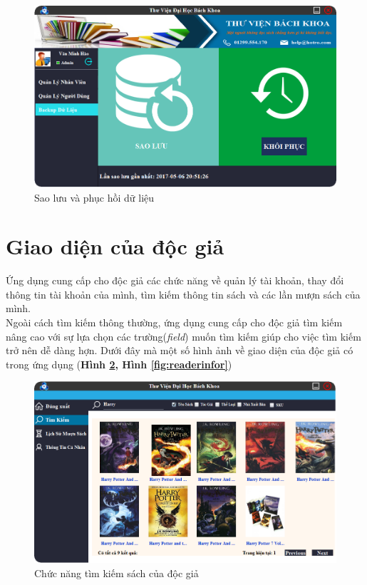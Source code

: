 \documentclass[12pt]{report}
\begin{document}
\begin{itemize}
						\begin{figure}[H]
						\centering
						\includegraphics[scale=0.6]{images/backup.png}
						\caption{Sao lưu và phục hồi dữ liệu}
						\label{fig:backup}
						\end{figure}			
				\end{itemize}
			\section{Giao diện của độc giả}
			Ứng dụng cung cấp cho độc giả các chức năng về quản lý tài khoản, thay đổi thông tin tài khoản của mình, tìm kiếm thông tin sách và các lần mượn sách của mình.\\
			Ngoài cách tìm kiếm thông thường, ứng dụng cung cấp cho độc giả tìm kiếm nâng cao với sự lựa chọn các trường(\textit{field}) muốn tìm kiếm giúp cho việc tìm kiếm trở nên dễ dàng hợn.
			Dưới đây mà một số hình ảnh về giao diện của độc giả có trong ứng dụng (\textbf{Hình \ref{fig:rdsearch}, Hình \ref{fig:readerinfor}})
						\begin{figure}[H]
						\centering
						\includegraphics[scale=0.65]{images/searchreader.png}
						\caption{Chức năng tìm kiếm sách của độc giả}
						\label{fig:rdsearch}
						\end{figure}
						
\end{document}
